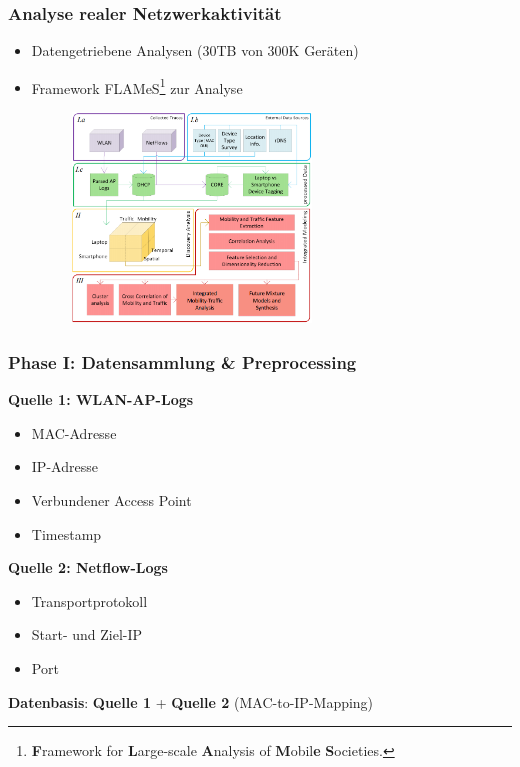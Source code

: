 \documentclass{beamer}
\begin{document}
\begin{frame}
\frametitle{Analyse realer Netzwerkaktivität}
\begin{itemize}
  \item Datengetriebene Analysen ($30$\textsc{TB} von $300$\textsc{K} Geräten)
  \item Framework FLAMeS\footnote{\textbf{F}ramework for \textbf{L}arge-scale \textbf{A}nalysis of 
  \textbf{M}obil\textbf{e} \textbf{S}ocieties.} zur Analyse
  \begin{figure}
    \centering
    \includegraphics[width=0.6\textwidth]{images/FLAMeS.png}\newline  
  \end{figure}  
\end{itemize}
\end{frame}

\begin{frame}
  \frametitle{Phase I: Datensammlung \& Preprocessing}
  \textbf{Quelle 1: WLAN-AP-Logs}
  \begin{itemize}
    \item MAC-Adresse
    \item IP-Adresse
    \item Verbundener Access Point
    \item Timestamp
  \end{itemize}
  \textbf{Quelle 2: Netflow-Logs}
  \begin{itemize}
    \item Transportprotokoll
    \item Start- und Ziel-IP
    \item Port
  \end{itemize}
  \textbf{Datenbasis}: \textbf{Quelle 1} + \textbf{Quelle 2} (MAC-to-IP-Mapping)
\end{frame}
\end{document}
